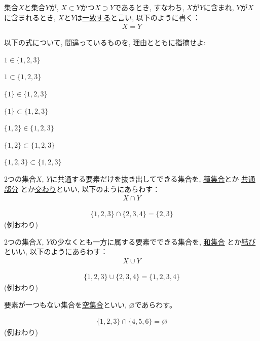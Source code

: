 集合$X$と集合$Y$が, $X\subset Y$かつ$X\supset Y$であるとき, すなわち, 
$X$が$Y$に含まれ, $Y$が$X$に含まれるとき, $X$と$Y$は\underline{一致する}と言い,
以下のように書く：
\begin{eqnarray}
X = Y
\end{eqnarray}
\mv

\begin{q}\label{q:logic_subset0} 以下の式について, 間違っているものを, 理由とともに指摘せよ:
\begin{edaenumerate}
\item $1\in\{1, 2, 3\}$
\item $1\subset\{1, 2, 3\}$
\item $\{1\}\in\{1, 2, 3\}$
\item $\{1\}\subset\{1, 2, 3\}$
\item $\{1, 2\}\in\{1, 2, 3\}$
\item $\{1, 2\}\subset\{1, 2, 3\}$
\item $\{1, 2, 3\}\subset\{1, 2, 3\}$
\end{edaenumerate}
\end{q}
\mv

2つの集合$X$, $Y$に共通する要素だけを抜き出してできる集合を, \underline{積集合}とか
\underline{共通部分}
とか\underline{交わり}といい, 以下のようにあらわす：
\begin{eqnarray}
X \cap Y
\end{eqnarray}

\begin{exmpl}
\begin{eqnarray}
\{1, 2, 3\} \cap \{2, 3, 4\}=\{2, 3\}
\end{eqnarray}
(例おわり)\end{exmpl}
\mv

2つの集合$X$, $Y$の少なくとも一方に属する要素でできる集合を, \underline{和集合}
とか\underline{結び}といい, 以下のようにあらわす：
\begin{eqnarray}
X \cup Y
\end{eqnarray}

\begin{exmpl}
\begin{eqnarray}
\{1, 2, 3\} \cup \{2, 3, 4\}=\{1, 2, 3, 4\}
\end{eqnarray}
(例おわり)\end{exmpl}
\mv

要素が一つもない集合を\underline{空集合}といい, $\varnothing$であらわす。
\begin{exmpl}
\begin{eqnarray}
\{1, 2, 3\} \cap \{4, 5, 6\}=\varnothing
\end{eqnarray}
(例おわり)\end{exmpl}
\mv

